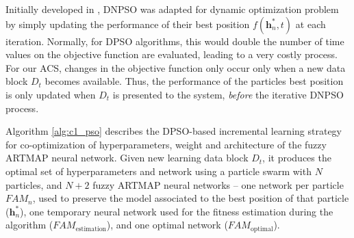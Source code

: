 Initially developed in \cite{nickabadi08_1}, DNPSO was adapted for dynamic optimization problem by simply updating the performance of their best position $f(\textbf{h}^*_n,t)$ at each iteration. Normally, for DPSO algorithms, this would double the number of time values on the objective function are evaluated, leading to a very costly process. For our ACS, changes in the objective function only occur only when a new data block $D_t$ becomes available. Thus, the performance of the particles best position is only updated when $D_t$ is presented to the system, \emph{before} the iterative DNPSO process.

Algorithm \ref{alg:c1_pso} describes the DPSO-based incremental learning strategy for co-optimization of hyperparameters, weight and architecture of the fuzzy ARTMAP neural network. Given new learning data block $D_t$, it produces the optimal set of hyperparameters and network using a particle swarm with $N$ particles, and $N+2$ fuzzy ARTMAP neural networks -- one network per particle $\textit{FAM}_n$, used to preserve the model associated to the best position of that particle ($\textbf{h}^*_n$), one temporary neural network used for the fitness estimation during the algorithm ($\textit{FAM}_\text{estimation}$), and one optimal network ($\textit{FAM}_\text{optimal}$).

